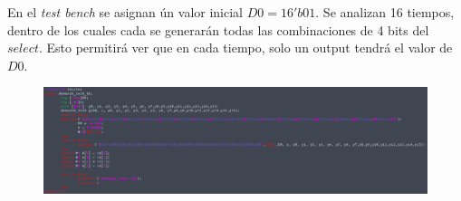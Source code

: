 \documentclass[11pt,a4paper]{article}
\begin{document}
\begin{enumerate}
\begin{enumerate}[label=(\alph*)]
En el \textit{test bench} se asignan ún valor inicial $D0 = 16'b01$. Se analizan 16 tiempos, dentro de los cuales cada se generarán todas las combinaciones de 4 bits del $select$. Esto permitirá ver que en cada tiempo, solo un output tendrá el valor de $D0$.
\begin{figure}[h!]
\centering
\includegraphics[scale=0.25]{16_1x16DEMUX_2.png} 
\end{figure}


\end{enumerate}
\end{enumerate}
\end{document}
